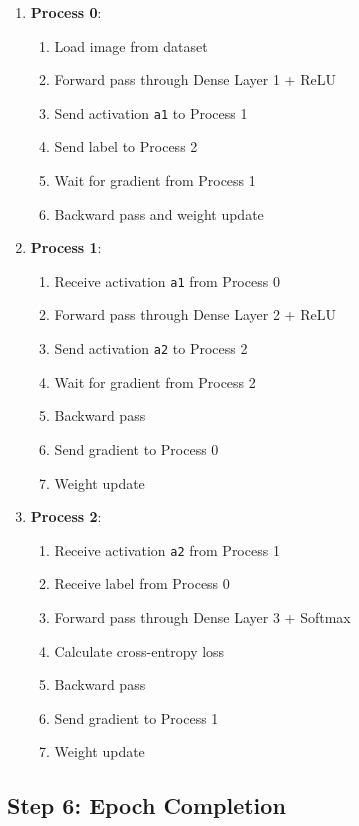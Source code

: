 \documentclass[11pt,a4paper]{article}
\begin{document}
\begin{enumerate}
    \item \textbf{Process 0}:
    \begin{enumerate}[label=\alph*.]
        \item Load image from dataset
        \item Forward pass through Dense Layer 1 + ReLU
        \item Send activation \texttt{a1} to Process 1
        \item Send label to Process 2
        \item Wait for gradient from Process 1
        \item Backward pass and weight update
    \end{enumerate}
    
    \item \textbf{Process 1}:
    \begin{enumerate}[label=\alph*.]
        \item Receive activation \texttt{a1} from Process 0
        \item Forward pass through Dense Layer 2 + ReLU
        \item Send activation \texttt{a2} to Process 2
        \item Wait for gradient from Process 2
        \item Backward pass
        \item Send gradient to Process 0
        \item Weight update
    \end{enumerate}
    
    \item \textbf{Process 2}:
    \begin{enumerate}[label=\alph*.]
        \item Receive activation \texttt{a2} from Process 1
        \item Receive label from Process 0
        \item Forward pass through Dense Layer 3 + Softmax
        \item Calculate cross-entropy loss
        \item Backward pass
        \item Send gradient to Process 1
        \item Weight update
    \end{enumerate}
\end{enumerate}

\subsection{Step 6: Epoch Completion}
\end{document}
